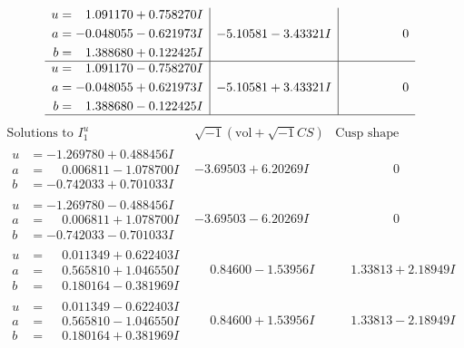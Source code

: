 \documentclass[1p]{elsarticle_modified}
\theoremstyle{definition}
\newcommand{\I}{\sqrt{-1}}
\begin{document}
$$\begin{array}{c|c|c}
\begin{aligned}
u &= \phantom{-}1.091170 + 0.758270 I \\
a &= -0.048055 - 0.621973 I \\
b &= \phantom{-}1.388680 + 0.122425 I\end{aligned}
 & -5.10581 - 3.43321 I & \phantom{-0.000000 } 0 \\ \hline\begin{aligned}
u &= \phantom{-}1.091170 - 0.758270 I \\
a &= -0.048055 + 0.621973 I \\
b &= \phantom{-}1.388680 - 0.122425 I\end{aligned}
 & -5.10581 + 3.43321 I & \phantom{-0.000000 } 0\\
 \hline 
 \end{array}$$\newpage$$\begin{array}{c|c|c}  
\text{Solutions to }I^u_{1}& \I (\text{vol} + \sqrt{-1}CS) & \text{Cusp shape}\\
 \hline 
\begin{aligned}
u &= -1.269780 + 0.488456 I \\
a &= \phantom{-}0.006811 - 1.078700 I \\
b &= -0.742033 + 0.701033 I\end{aligned}
 & -3.69503 + 6.20269 I & \phantom{-0.000000 } 0 \\ \hline\begin{aligned}
u &= -1.269780 - 0.488456 I \\
a &= \phantom{-}0.006811 + 1.078700 I \\
b &= -0.742033 - 0.701033 I\end{aligned}
 & -3.69503 - 6.20269 I & \phantom{-0.000000 } 0 \\ \hline\begin{aligned}
u &= \phantom{-}0.011349 + 0.622403 I \\
a &= \phantom{-}0.565810 + 1.046550 I \\
b &= \phantom{-}0.180164 - 0.381969 I\end{aligned}
 & \phantom{-}0.84600 - 1.53956 I & \phantom{-}1.33813 + 2.18949 I \\ \hline\begin{aligned}
u &= \phantom{-}0.011349 - 0.622403 I \\
a &= \phantom{-}0.565810 - 1.046550 I \\
b &= \phantom{-}0.180164 + 0.381969 I\end{aligned}
 & \phantom{-}0.84600 + 1.53956 I & \phantom{-}1.33813 - 2.18949 I \\ \hline\begin{aligned}

\end{aligned}
\end{array}$$
\end{document}
